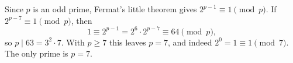 Since $p$ is an odd prime, Fermat's little theorem gives $2^{p-1}\equiv1\pmod p$. If $2^{p-7}\equiv1\pmod p$, then
\[1\equiv2^{p-1}=2^6\cdot2^{p-7}\equiv64\pmod p,\]
so $p\mid63=3^2\cdot7$. With $p\ge7$ this leaves $p=7$, and indeed $2^{0}=1\equiv1\pmod7$. The only prime is $\boxed{p=7}$.
